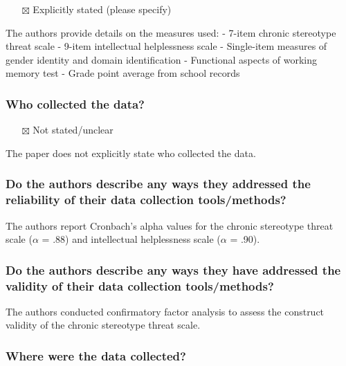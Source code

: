 \documentclass[
  doc, a4paper]{apa7}
\providecommand{\tightlist}{%
  \setlength{\itemsep}{0pt}\setlength{\parskip}{0pt}}
\begin{document}
\begin{itemize}
\tightlist
\item[$\boxtimes$]
  Explicitly stated (please specify)
\end{itemize}

The authors provide details on the measures used:
- 7-item chronic stereotype threat scale
- 9-item intellectual helplessness scale
- Single-item measures of gender identity and domain identification
- Functional aspects of working memory test
- Grade point average from school records

\subsubsection{Who collected the data?}\label{who-collected-the-data}

\begin{itemize}
\tightlist
\item[$\boxtimes$]
  Not stated/unclear
\end{itemize}

The paper does not explicitly state who collected the data.

\subsubsection{Do the authors describe any ways they addressed the reliability of their data collection tools/methods?}\label{do-the-authors-describe-any-ways-they-addressed-the-reliability-of-their-data-collection-toolsmethods}

The authors report Cronbach's alpha values for the chronic stereotype threat scale (\(\alpha\) = .88) and intellectual helplessness scale (\(\alpha\) = .90).

\subsubsection{Do the authors describe any ways they have addressed the validity of their data collection tools/methods?}\label{do-the-authors-describe-any-ways-they-have-addressed-the-validity-of-their-data-collection-toolsmethods}

The authors conducted confirmatory factor analysis to assess the construct validity of the chronic stereotype threat scale.

\subsubsection{Where were the data collected?}\label{where-were-the-data-collected}
\end{document}
